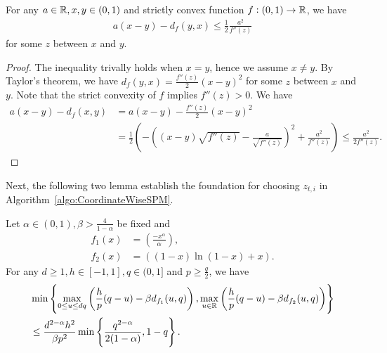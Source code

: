 \begin{lemma}
    For any $a \in \mathbb{R}, x, y \in (0,1)$ and strictly convex function $f: (0,1) \to \mathbb{R}$, we have
    \begin{align*}
        a(x - y) - d_f(y, x) \leq \frac{1}{2}\frac{a^2}{f''(z)}
    \end{align*}
    for some $z$ between $x$ and $y$.
    \label{lemma:onedimensionalLocalNorm}
\end{lemma}
\begin{proof}
    The inequality trivally holds when $x = y$, hence we assume $x \neq y$. By Taylor's theorem, we have $d_f(y,x) = \frac{f''(z)}{2}(x-y)^2$ for some $z$ between $x$ and $y$. Note that the strict convexity of $f$ implies $f''(z) > 0$. We have
    \begin{align*}
        a(x-y) - d_f(x,y) &= a(x-y) - \frac{f''(z)}{2}(x-y)^2 \\
        &= \frac{1}{2}\left( -\left((x-y)\sqrt{f''(z)} - \frac{a}{\sqrt{f''(z)}}\right)^2 + \frac{a^2}{f''(z)} \right) \leq \frac{a^2}{2f''(z)}.
    \end{align*}
\end{proof}
%
Next, the following two lemma establish the foundation for choosing $z_{t,i}$ in Algorithm~\ref{algo:CoordinateWiseSPM}.
\begin{lemma}
    Let $\alpha \in (0,1), \beta > \frac{4}{1-\alpha}$ be fixed and 
    \begin{align*}
        f_1(x) &= \left(\frac{-x^\alpha}{\alpha}\right), \\
        f_2(x) &= ((1-x)\ln(1-x) + x).
    \end{align*}
    For any $d \geq 1, h \in [-1, 1], q \in (0,1]$ and $p \geq \frac{q}{2}$, we have
    \begin{align*}
        &\min\left\{ \max_{0 \leq u \leq dq}\left(\frac{h}{p}(q - u) - \beta d_{f_1}(u, q)\right), \max_{u \in \mathbb{R}}\left(\frac{h}{p}(q - u) - \beta d_{f_2}(u, q)\right) \right\} \\
        &\leq \frac{d^{2-\alpha}h^2}{\beta p^2} \min\left\{ \frac{q^{2-\alpha}}{2(1-\alpha)}, 1-q \right\}.
    \end{align*}
    \label{lemma:CoordinateWiseSPMStabilityBetaTerms}
\end{lemma}
